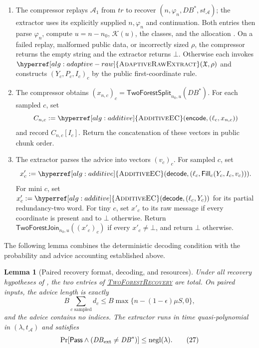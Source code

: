 \documentclass[11pt]{article}
\newenvironment{fminipage}%
  {\begin{Sbox}\begin{minipage}}%
  {\end{minipage}\end{Sbox}\fbox{\TheSbox}}
\newenvironment{algbox}[0]{%
\vskip 0.2in
\noindent
\begin{fminipage}{6.3in}
}{%
\end{fminipage}
\vskip 0.2in
}
\newtheorem{lemma}{Lemma}[section]
\begin{document}
\begin{algbox}
\begin{enumerate}[leftmargin=*,label=\arabic*.]
 \item The compressor replays $\mathcal A_1$ from $\mathit{tr}$ to recover
 $(n,\varphi_n,\mathit{DB}^{*},\mathit{st}_{\mathcal A})$; the extractor uses
 its explicitly supplied $n,\varphi_n$ and continuation.  Both entries then
 parse $\varphi_n$, compute $u=n-n_0$, $\mathcal K(u)$, the classes, and the
 allocation .  On a failed replay, malformed public data,
 or incorrectly sized $\rho$, the compressor returns the empty string and the
 extractor returns $\bot$.  Otherwise each invokes
 $\hyperref[alg:adaptive-raw]{\textsc{AdaptiveRawExtract}}(\mathfrak X,\rho)$
 and constructs
 $(Y_c,P_c,I_c)_c$ by the public first-coordinate rule.
 \item The compressor obtains
 $(x_{n,c})_c=\mathsf{TwoForestSplit}_{n_0,u}(\mathit{DB}^{*})$.  For each
 sampled $c$, set
 \[
 C_{n,c}:=
 \hyperref[alg:additive]{\textsc{AdditiveEC}}
 (\mathsf{encode},(\ell_c,x_{n,c}))
 \]
 and record $C_{n,c}[I_c]$.  Return the concatenation of these vectors in
 public chunk order.
 \item The extractor parses the advice into vectors $(v_c)_c$.  For sampled
 $c$, set
 \[
 x'_c:=
 \hyperref[alg:additive]{\textsc{AdditiveEC}}(\mathsf{decode},
 (\ell_c,\mathsf{Fill}_c(Y_c,I_c,v_c))).
 \]
 For mini $c$, set
 $x'_c:=\hyperref[alg:additive]{\textsc{AdditiveEC}}
 (\mathsf{decode},(\ell_c,Y_c))$ for its partial redundancy-two word.  For
 tiny $c$, set $x'_c$ to its raw message if every
 coordinate is present and to $\bot$ otherwise.  Return
 $\mathsf{TwoForestJoin}_{n_0,u}((x'_c)_c)$ if every $x'_c\ne\bot$, and return
 $\bot$ otherwise.
\end{enumerate}
\end{algbox}

The following lemma combines the deterministic decoding condition with the
probability and advice accounting established above.

\begin{lemma}[Paired recovery format, decoding, and resources]
\label{lem:recovery}
Under all recovery hypotheses of , the two entries of
\hyperref[alg:recovery]{\textsc{TwoForestRecovery}} are total.  On paired
inputs, the advice length is exactly
\[
 B\sum_{c\text{ sampled}}d_c
 \le B\max\{n-(1-\epsilon)\mu S,0\},
\tag{26}\label{eq:advice}
\]
and the advice contains no indices.  The extractor runs in time
quasi-polynomial in $(\lambda,t_{\mathcal A})$ and satisfies
\[
 \Pr[\mathsf{Pass}\wedge
 (\mathit{DB}_{\rm ext}\ne\mathit{DB}^{*})]
 \le\operatorname{negl}(\lambda).
\tag{27}\label{eq:recovery-probability}
\]
\end{lemma}
\end{document}
